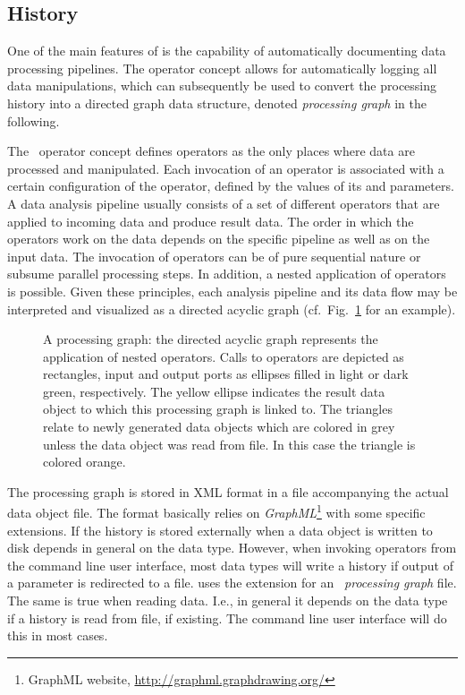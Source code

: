 \subsection{History}


One of the main features of \alida is the capability of automatically documenting data processing
pipelines. 
The operator concept allows for automatically logging all data manipulations,
which can subsequently be used to convert the
processing history into a directed graph data structure, denoted {\em processing
graph} in the following.
 
The \alida\ operator concept defines operators as the only places where data are processed and manipulated. 
Each invocation of an operator is associated with a certain configuration of the operator, defined by the values of its  and  parameters.
A data analysis pipeline usually consists of a set of different operators that are applied to incoming data and
produce result data. The order in which the operators work on the data depends on the specific pipeline as well as on the input data. The invocation of
operators can be of pure sequential nature or subsume parallel processing steps. In addition, a nested application
of operators is possible. Given these principles, each analysis pipeline and its
data flow may be interpreted
and visualized as a directed acyclic graph (cf.~Fig.~\ref{fig:DAG2} for an
example).

\begin{figure}[t]
\begin{center}
\centerline{}
\end{center}
\vspace*{-0.75cm}
\caption[Example of a processing graph.]{\label{fig:DAG2}
A processing graph: the directed acyclic graph represents the application of nested operators. 
Calls to operators are depicted as rectangles, input and output ports as ellipses filled in light or dark green,
respectively. 
The yellow ellipse indicates the result data object
to which this processing graph is linked to.
The triangles relate to newly generated data objects which are colored in grey
unless the data object was read from file.
In this case the triangle is colored orange.}
\end{figure}

The processing graph is stored in XML format in a file accompanying the actual data object file. 
The format basically relies on {\em GraphML}\footnote{GraphML website, 
\href{http://graphml.graphdrawing.org/}{http://graphml.graphdrawing.org/}} with some \alida 
specific extensions. 
If the history is stored externally when a data object is written to disk
depends in general on the data type.
However, when invoking operators from the command line user interface,
most \alida data types will write a history if output of a parameter is
redirected to a file.
\alida uses the
extension  for an {\em \alida\ processing graph} file.
The same is true when reading data.
I.e., in general it depends on the data type if a history is read from file, if
existing. The command line user interface will do this in most cases.

